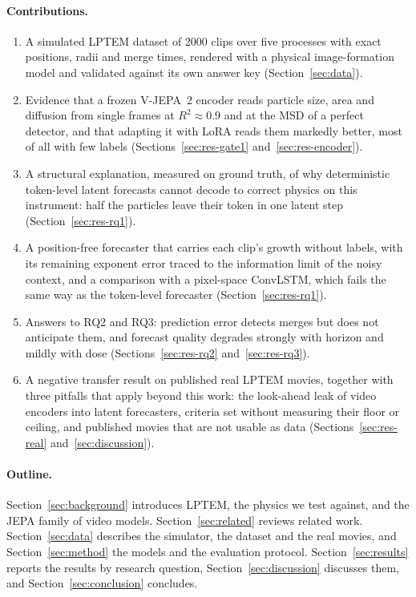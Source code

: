 \paragraph{Contributions.}
\begin{enumerate}
  \item A simulated LPTEM dataset of 2000 clips over five processes with exact positions,
    radii and merge times, rendered with a physical image-formation model and validated
    against its own answer key (Section~\ref{sec:data}).
  \item Evidence that a frozen V-JEPA~2 encoder reads particle size, area and diffusion
    from single frames at $R^2 \approx 0.9$ and at the MSD of a perfect detector, and that
    adapting it with LoRA reads them markedly better, most of all with few labels
    (Sections~\ref{sec:res-gate1} and~\ref{sec:res-encoder}).
  \item A structural explanation, measured on ground truth, of why deterministic
    token-level latent forecasts cannot decode to correct physics on this instrument:
    half the particles leave their token in one latent step (Section~\ref{sec:res-rq1}).
  \item A position-free forecaster that carries each clip's growth without labels,
    with its remaining exponent error traced to the information limit of the noisy
    context, and a comparison with a pixel-space ConvLSTM, which fails the same way as
    the token-level forecaster (Section~\ref{sec:res-rq1}).
  \item Answers to RQ2 and RQ3: prediction error detects merges but does not anticipate
    them, and forecast quality degrades strongly with horizon and mildly with dose
    (Sections~\ref{sec:res-rq2} and~\ref{sec:res-rq3}).
  \item A negative transfer result on published real LPTEM movies, together with three
    pitfalls that apply beyond this work: the look-ahead leak of video encoders into
    latent forecasters, criteria set without measuring their floor or ceiling, and
    published movies that are not usable as data (Sections~\ref{sec:res-real}
    and~\ref{sec:discussion}).
\end{enumerate}

\paragraph{Outline.} Section~\ref{sec:background} introduces LPTEM, the physics we test
against, and the JEPA family of video models. Section~\ref{sec:related} reviews
related work. Section~\ref{sec:data} describes the simulator, the dataset and the real
movies, and Section~\ref{sec:method} the models and the evaluation protocol.
Section~\ref{sec:results} reports the results by research question,
Section~\ref{sec:discussion} discusses them, and Section~\ref{sec:conclusion} concludes.
